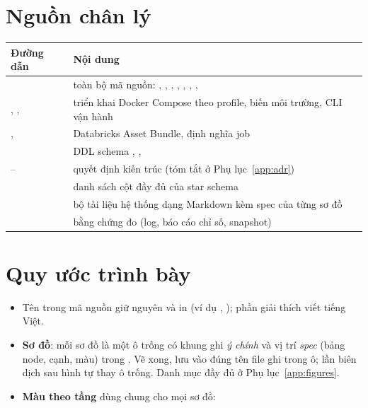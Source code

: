 \section*{Nguồn chân lý}
\begin{xltabular}{\linewidth}{@{}L{55mm}Y@{}}
  \toprule
  \textbf{Đường dẫn} & \textbf{Nội dung} \\
  \midrule
   & toàn bộ mã nguồn: , , , , , , ,  \\
  , ,  & triển khai Docker Compose theo profile, biến môi trường, CLI vận hành \\
  ,  & Databricks Asset Bundle, định nghĩa job \\
   & DDL schema , ,  \\
  -- & quyết định kiến trúc (tóm tắt ở Phụ lục~\ref{app:adr}) \\
   & danh sách cột đầy đủ của star schema \\
   & bộ tài liệu hệ thống dạng Markdown kèm spec của từng sơ đồ \\
   & bằng chứng đo (log, báo cáo chỉ số, snapshot) \\
  \bottomrule
\end{xltabular}

\section*{Quy ước trình bày}
\begin{itemize}
  \item Tên trong mã nguồn giữ nguyên và in  (ví dụ , ); phần giải thích viết tiếng Việt.
  \item \textbf{Sơ đồ}: mỗi sơ đồ là một ô trống có khung ghi \emph{ý chính} và vị trí \emph{spec} (bảng node, cạnh, màu) trong . Vẽ xong, lưu vào  đúng tên file ghi trong ô; lần biên dịch sau hình tự thay ô trống. Danh mục đầy đủ ở Phụ lục~\ref{app:figures}.
  \item \textbf{Màu theo tầng} dùng chung cho mọi sơ đồ:
\end{itemize}


